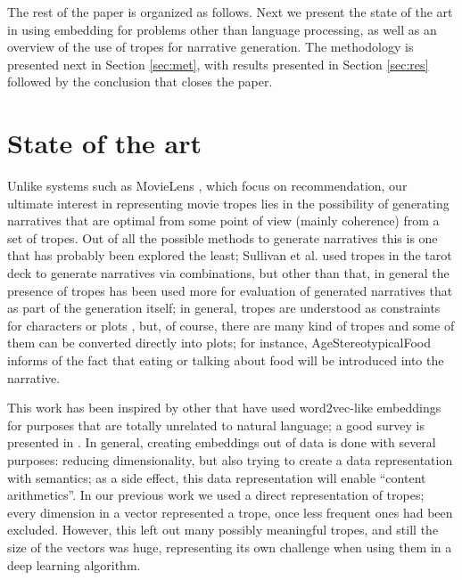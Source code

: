 \documentclass[letterpaper]{article}
\begin{document}

	
	

	The rest of the paper is organized as follows. Next we present the
	state of the art in using embedding for problems other than language
	processing, as well as an overview of the use of tropes for narrative
	generation. The methodology is presented next in Section
	\ref{sec:met}, with results presented in Section \ref{sec:res}
	followed by the conclusion that closes the paper.
	
	
	\section{State of the art}
	
	Unlike systems such as MovieLens \cite{10.1145/2827872}, which focus
	on recommendation, our ultimate
	interest in representing movie tropes lies in the possibility of
	generating narratives \cite{10.5555/931357} that are optimal from some point of view (mainly
	coherence) from a set of tropes. Out of all the possible methods to
	generate narratives \cite{van2019narrative} this is one that has
	probably been explored the least; Sullivan et
	al. \cite{10.1145/3235765.3235819} used tropes in the tarot deck to
	generate narratives via combinations, but other than that, in general
	the presence of tropes has been used more for evaluation of generated
	narratives \cite{gervas2012story} that as part of the generation
	itself; in general, tropes are understood as constraints for
	characters or plots \cite{Thompson18NarrativeEvents}, but, of course,
	there are many kind of tropes and some of them can be converted
	directly into plots; for instance, {\sf AgeStereotypicalFood} informs
	of the fact that eating or talking about food will be introduced into
	the narrative.
	
	This work has been inspired by other that have used
	word2vec-like embeddings for purposes that are totally
	unrelated to natural language; a good survey is presented in
	\cite{nonnlp19}. In general, creating embeddings out of data
	is done with several purposes: reducing dimensionality, but
	also trying to create a data representation with semantics; as
	a side effect, this data representation will enable ``content
	arithmetics''. In our previous work
	\cite{doi:10.1111/exsy.12525} we used a direct representation
	of tropes; every dimension in a vector represented a trope,
	once less frequent ones had been excluded. However, this left
	out many possibly meaningful tropes, and still the size of the
	vectors was huge, representing its own challenge when using
	them in a deep learning algorithm.
	
\end{document}
